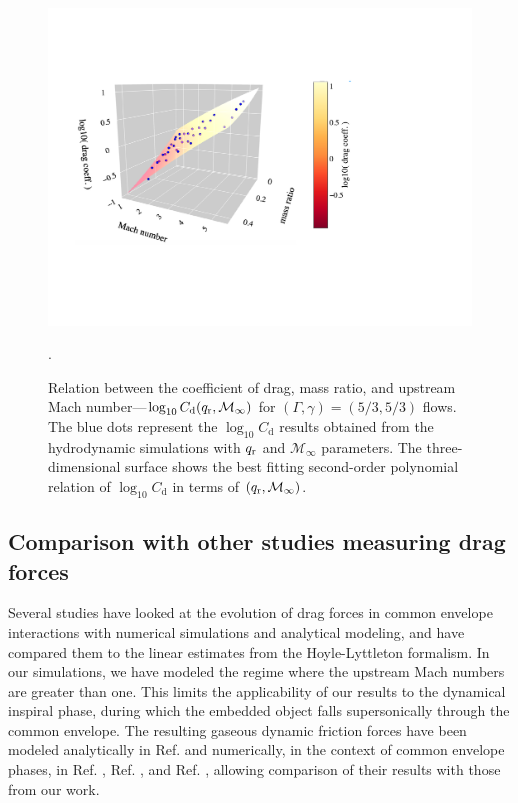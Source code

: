 \begin{figure}
 \centering
 \includegraphics[width=14cm]{figures/common_envelope/logdrag_order2_g53_inc_mdotdrag.pdf}\caption{Relation between the coefficient of drag, mass ratio, and upstream Mach number---$\log_{10}C_{\mathrm d} (q_{\rm r}, \mathcal{M}_\infty)$ for $(\Gamma, \gamma) = (5/3, 5/3)$ flows. The blue dots represent the $\log_{10}C_{\mathrm d}$ results obtained from the hydrodynamic simulations with $q_{\rm r}$ and $\mathcal{M}_\infty$ parameters. The three-dimensional surface shows the best fitting second-order polynomial relation of $\log_{10}C_{\mathrm d}$ in terms of $(q_{\rm r}, \mathcal{M}_\infty)$.\label{fig:logdrag_g53}}.
\end{figure}

\subsection{Comparison with other studies measuring drag forces\label{sec:compare_drag}}
Several studies have looked at the evolution of drag forces in common envelope interactions with numerical simulations and analytical modeling, and have compared them to the linear estimates from the Hoyle-Lyttleton formalism. In our simulations, we have modeled the regime where the upstream Mach numbers are greater than one. This limits the applicability of our results to the dynamical inspiral phase, during which the embedded object falls supersonically through the common envelope. The resulting gaseous dynamic friction forces have been modeled analytically in Ref. \cite{1999ApJ...513..252O} and numerically, in the context of common envelope phases, in Ref. \cite{Staff:2016}, Ref. \cite{Reichardt:2019}, and Ref. \cite{Chamandy:2019psk}, allowing comparison of their results with those from our work.

